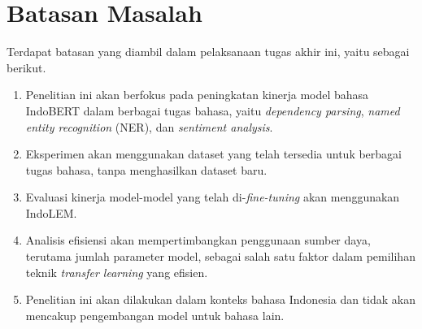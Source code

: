 \section{Batasan Masalah}
\label{sec:batasan-masalah}

Terdapat batasan yang diambil dalam pelaksanaan tugas akhir ini, yaitu sebagai berikut.

\begin{enumerate}
    \item Penelitian ini akan berfokus pada peningkatan kinerja model bahasa IndoBERT dalam berbagai tugas bahasa, yaitu \textit{dependency parsing},  \textit{named entity recognition} (NER), dan \textit{sentiment analysis}.
    \item Eksperimen akan menggunakan dataset yang telah tersedia untuk berbagai tugas bahasa, tanpa menghasilkan dataset baru.
    \item Evaluasi kinerja model-model yang telah di-\textit{fine-tuning} akan menggunakan IndoLEM.
    \item Analisis efisiensi akan mempertimbangkan penggunaan sumber daya, terutama jumlah parameter model, sebagai salah satu faktor dalam pemilihan teknik \textit{transfer learning} yang efisien.
    \item Penelitian ini akan dilakukan dalam konteks bahasa Indonesia dan tidak akan mencakup pengembangan model untuk bahasa lain.
\end{enumerate}
